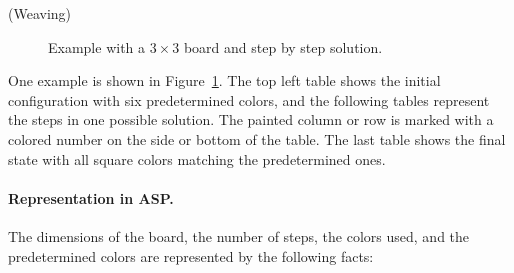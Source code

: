 \documentclass[a4paper,12pt]{article}
\begin{document}
\begin{PraktikumsAufgabe}{1}{(Weaving)}
\begin{figure}[h]
\begin{center}
\end{center}
\vspace*{-6mm}
\caption{Example with a $3\times 3$ board and step by step solution.\label{fig:weaving}}
\end{figure}

\noindent
One example is shown in Figure~\ref{fig:weaving}.
The top left table shows the initial configuration with six predetermined colors,
and the following tables represent the steps in one possible solution.
The painted column or row is marked with a colored number on the side or bottom of the table.
The last table shows the final state with all square colors matching the predetermined ones.

\paragraph{Representation in ASP.}
The dimensions of the board,
the number of steps,
the colors used,
and the predetermined colors are represented by the following facts:


\end{PraktikumsAufgabe}
\end{document}
